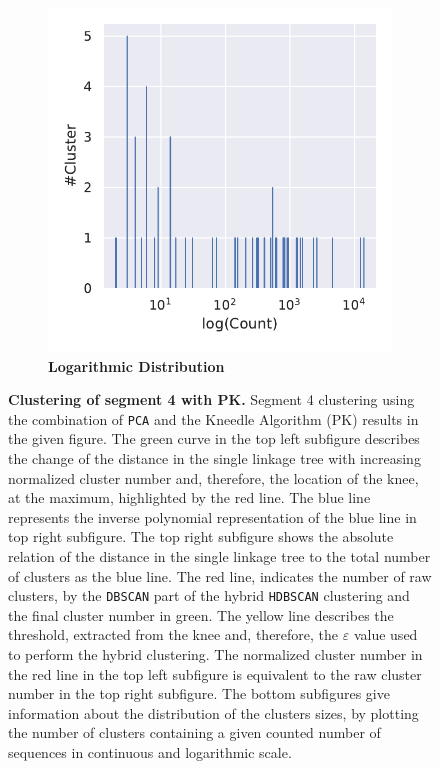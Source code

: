 \begin{figure}[!hbt]
\begin{subfigure}[b]{0.475\textwidth}
    \end{subfigure}
    \hfill
    \begin{subfigure}[b]{0.475\textwidth}
        \caption[Logarithmic Distribution]{\textbf{Logarithmic Distribution}}
        \label{subfig:PCA_Cluster_Knee_Distribution_log_4}            \includegraphics[width=\textwidth]{PCA/Cluster_Distribution_Log_Segment_4.pdf}
    \end{subfigure}
    \caption[Clustering of segment 4 with PK]{\textbf{Clustering of segment 4 with PK.} Segment 4 clustering using the combination of \texttt{PCA} and the Kneedle Algorithm (PK) results in the given figure. The green curve in the top left subfigure describes the change of the distance in the single linkage tree with increasing normalized cluster number and, therefore, the location of the knee, at the maximum, highlighted by the red line. The blue line represents the inverse polynomial representation of the blue line in top right subfigure. The top right subfigure shows the absolute relation of the distance in the single linkage tree to the total number of clusters as the blue line. The red line, indicates the number of raw clusters, by the \texttt{DBSCAN} part of the hybrid \texttt{HDBSCAN} clustering and the final cluster number in green. The yellow line describes the threshold, extracted from the knee and, therefore, the $\varepsilon$ value used to perform the hybrid clustering. The normalized cluster number in the red line in the top left subfigure is equivalent to the raw cluster number in the top right subfigure. The bottom subfigures give information about the distribution of the clusters sizes, by plotting the number of clusters containing a given counted number of sequences in continuous and logarithmic scale.}
    \label{fig:PCA_Cluster_Knee_4}
\end{figure}

